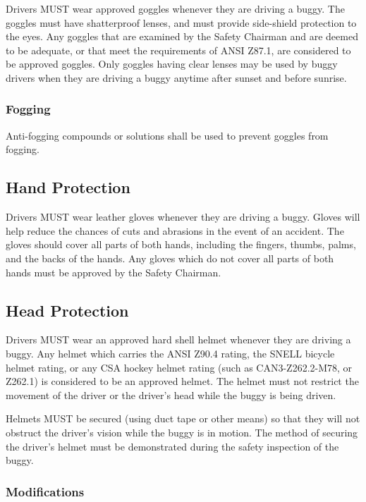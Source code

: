 	Drivers MUST wear approved goggles whenever they are driving a buggy. The
	goggles must have shatterproof lenses, and must provide side-shield protection
	to the eyes. Any goggles that are examined by the Safety Chairman and are
	deemed to be adequate, or that meet the requirements of ANSI Z87.1, are
	considered to be approved goggles. Only goggles having clear lenses may be used
	by buggy drivers when they are driving a buggy anytime after sunset and before
	sunrise.

\subsubsection{Fogging}
	Anti-fogging compounds or solutions shall be used to prevent goggles from fogging.

\subsection{Hand Protection}

	Drivers MUST wear leather gloves whenever they are driving a buggy. Gloves will
	help reduce the chances of cuts and abrasions in the event of an accident. The
	gloves should cover all parts of both hands, including the fingers, thumbs,
	palms, and the backs of the hands. Any gloves which do not cover all parts of
	both hands must be approved by the Safety Chairman.

\subsection{Head Protection}

	Drivers MUST wear an approved hard shell helmet whenever they are driving a
	buggy. Any helmet which carries the ANSI Z90.4 rating, the SNELL bicycle helmet
	rating, or any CSA hockey helmet rating (such as CAN3-Z262.2-M78, or Z262.1) is
	considered to be an approved helmet. The helmet must not restrict the movement
	of the driver or the driver's head while the buggy is being driven.

	Helmets MUST be secured (using duct tape or other means) so that they will not
	obstruct the driver's vision while the buggy is in motion. The method of
	securing the driver's helmet must be demonstrated during the safety inspection
	of the buggy.

\subsubsection{Modifications}
	

